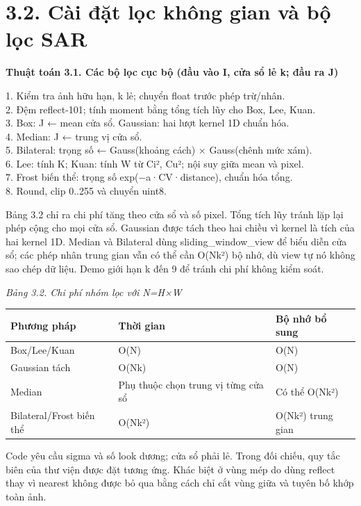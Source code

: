 \documentclass[13pt,a4paper]{extreport}
\begin{document}
\section*{3.2. Cài đặt lọc không gian và bộ lọc SAR}
\textbf{Thuật toán 3.1. Các bộ lọc cục bộ (đầu vào I, cửa sổ lẻ k; đầu ra J)}
\begin{flushleft}
1. Kiểm tra ảnh hữu hạn, k lẻ; chuyển float trước phép trừ/nhân.\\
2. Đệm reflect-101; tính moment bằng tổng tích lũy cho Box, Lee, Kuan.\\
3. Box: J ← mean cửa sổ. Gaussian: hai lượt kernel 1D chuẩn hóa.\\
4. Median: J ← trung vị cửa sổ.\\
5. Bilateral: trọng số ← Gauss(khoảng cách) × Gauss(chênh mức xám).\\
6. Lee: tính K; Kuan: tính W từ Ci², Cu²; nội suy giữa mean và pixel.\\
7. Frost biến thể: trọng số exp(−a·CV·distance), chuẩn hóa tổng.\\
8. Round, clip 0..255 và chuyển uint8.\\
\end{flushleft}
Bảng 3.2 chỉ ra chi phí tăng theo cửa sổ và số pixel. Tổng tích lũy tránh lặp lại phép cộng cho mọi cửa sổ. Gaussian được tách theo hai chiều vì kernel là tích của hai kernel 1D. Median và Bilateral dùng sliding\_window\_view để biểu diễn cửa sổ; các phép nhân trung gian vẫn có thể cần O(Nk²) bộ nhớ, dù view tự nó không sao chép dữ liệu. Demo giới hạn k đến 9 để tránh chi phí không kiểm soát.
\par
\noindent\textit{Bảng 3.2. Chi phí nhóm lọc với N=H×W}
\begin{longtable}{p{4.87cm}|p{4.87cm}|p{4.87cm}}
Phương pháp & Thời gian & Bộ nhớ bổ sung\\\hline
Box/Lee/Kuan & O(N) & O(N)\\\hline
Gaussian tách & O(Nk) & O(N)\\\hline
Median & Phụ thuộc chọn trung vị từng cửa sổ & Có thể O(Nk²)\\\hline
Bilateral/Frost biến thể & O(Nk²) & O(Nk²) trung gian\\\hline
\end{longtable}
Code yêu cầu sigma và số look dương; cửa sổ phải lẻ. Trong đối chiếu, quy tắc biên của thư viện được đặt tương ứng. Khác biệt ở vùng mép do dùng reflect thay vì nearest không được bỏ qua bằng cách chỉ cắt vùng giữa và tuyên bố khớp toàn ảnh.
\par
\clearpage
\end{document}
